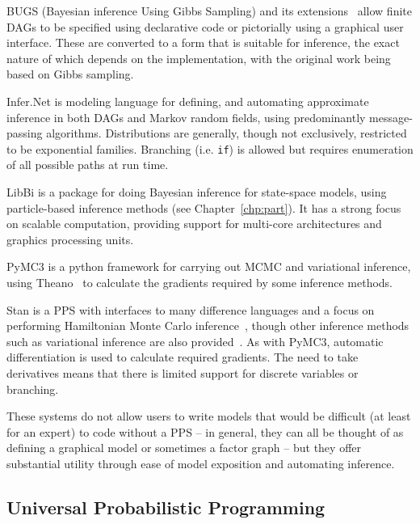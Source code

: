 BUGS (Bayesian inference Using Gibbs Sampling) \citep{spiegelhalter1996bugs} and its 
	extensions~\citep{lunn2000winbugs,plummer2003jags,todeschini2014biips}
	allow finite DAGs to be specified using declarative code or pictorially using a graphical user
	interface.  These are converted to a form that is suitable for inference, the exact nature of which
	depends on the implementation, with the original work being based on Gibbs sampling.
	
Infer.Net \citep{minka_software_2010} is modeling language for defining, and automating approximate inference in
	both DAGs and Markov random fields, using predominantly message-passing algorithms. Distributions
	are generally, though not exclusively, restricted to be exponential families.  Branching (i.e. \texttt{if}) 
	is allowed but requires enumeration of all possible paths at run time.

LibBi \citep{murray2013bayesian} is a package for doing Bayesian inference for state-space models,
	using particle-based inference methods (see Chapter~\ref{chp:part}).  It has a strong focus on scalable
	computation, providing support for multi-core architectures and graphics processing units.

PyMC3 \citep{salvatier2016probabilistic} is a python framework for carrying out MCMC and variational
	inference, using Theano~\citep{bergstra2010theano} to calculate the gradients required by some inference methods.

Stan \citep{carpenter2015stan} is a PPS with interfaces to many difference languages and a
	focus on performing Hamiltonian Monte Carlo inference~\citep{duane1987hybrid,hoffman2014no}, though
	other inference methods such as variational inference are also provided~\citep{kucukelbir2015automatic}.
	As with PyMC3, automatic differentiation is used to calculate required gradients.  The need to take
	derivatives means that there is limited support for discrete variables or branching.

These systems do not allow users to write models that would be difficult (at least for
an expert) to code without a PPS -- in general, they can all be thought of as defining a graphical model
or sometimes a factor graph -- but they offer substantial utility through ease of model exposition and
automating inference.

\subsection{Universal Probabilistic Programming}
\label{sec:probprog:two:general}

